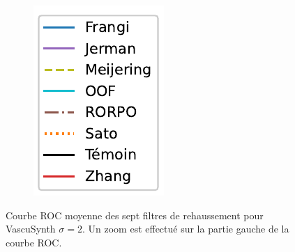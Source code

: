 \begin{figure}[!ht]
\begin{subfigure}[t]{0.2\textwidth}
  \includegraphics[width=\textwidth,clip = true]{Images/standAloneLegend.pdf}
\end{subfigure}
\caption{Courbe ROC moyenne des sept filtres de rehaussement pour VascuSynth $\sigma=2$. Un zoom est effectué sur la partie gauche de la courbe ROC.}
\end{figure}

